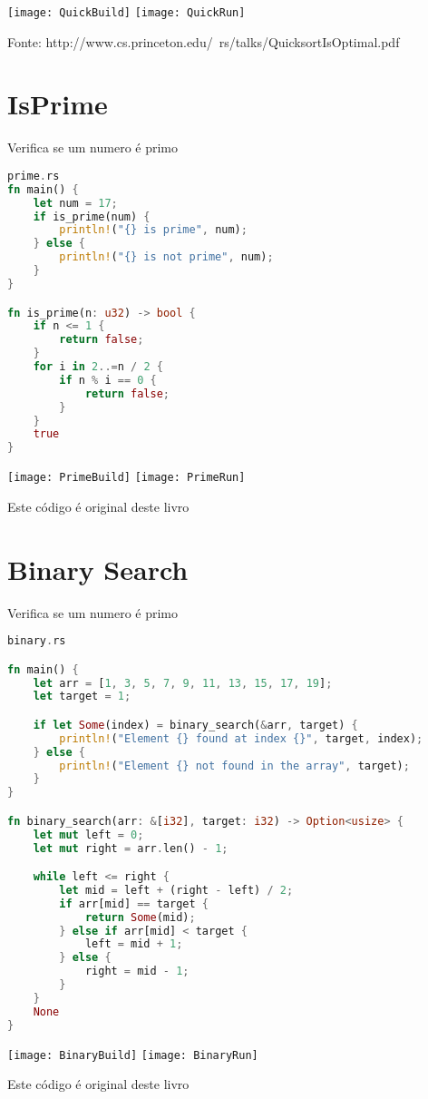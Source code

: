 \texttt{[image: QuickBuild]}
\texttt{[image: QuickRun]}

Fonte: http://www.cs.princeton.edu/~rs/talks/QuicksortIsOptimal.pdf

\pagebreak
\newpage
\section{IsPrime}
Verifica se um numero \'{e} primo

\begin{lstlisting}[language=rust]
prime.rs
fn main() {
    let num = 17;
    if is_prime(num) {
        println!("{} is prime", num);
    } else {
        println!("{} is not prime", num);
    }
}

fn is_prime(n: u32) -> bool {
    if n <= 1 {
        return false;
    }
    for i in 2..=n / 2 {
        if n % i == 0 {
            return false;
        }
    }
    true
}
\end{lstlisting}

\texttt{[image: PrimeBuild]}
\texttt{[image: PrimeRun]}

Este c\'{o}digo \'{e} original deste livro
\pagebreak
\newpage

\section{Binary Search}
Verifica se um numero \'{e} primo

\begin{lstlisting}[language=rust]
binary.rs

fn main() {
    let arr = [1, 3, 5, 7, 9, 11, 13, 15, 17, 19];
    let target = 1;

    if let Some(index) = binary_search(&arr, target) {
        println!("Element {} found at index {}", target, index);
    } else {
        println!("Element {} not found in the array", target);
    }
}

fn binary_search(arr: &[i32], target: i32) -> Option<usize> {
    let mut left = 0;
    let mut right = arr.len() - 1;

    while left <= right {
        let mid = left + (right - left) / 2;
        if arr[mid] == target {
            return Some(mid);
        } else if arr[mid] < target {
            left = mid + 1;
        } else {
            right = mid - 1;
        }
    }
    None
}
\end{lstlisting}

\texttt{[image: BinaryBuild]}
\texttt{[image: BinaryRun]}

Este c\'{o}digo \'{e} original deste livro
